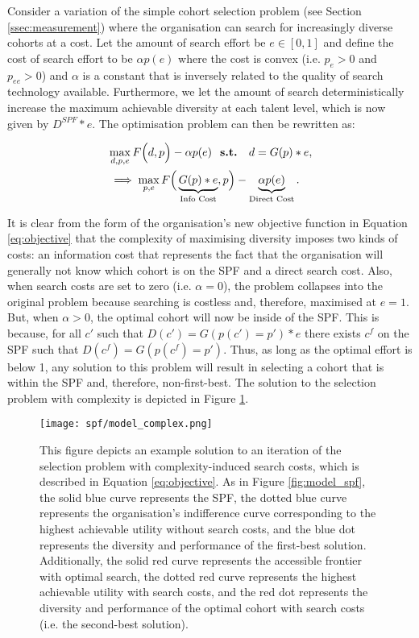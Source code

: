 Consider a variation of the simple cohort selection problem (see Section \ref{ssec:measurement}) where the organisation can search for increasingly diverse cohorts at a cost. Let the amount of search effort be $e\in[0,1]$ and define the cost of search effort to be $\alpha p(e)$ where the cost is convex (i.e. $p_e>0$ and $p_{ee}>0$) and $\alpha$ is a constant that is inversely related to the quality of search technology available. Furthermore, we let the amount of search deterministically increase the maximum achievable diversity at each talent level, which is now given by $D^{SPF}*e$. The optimisation problem can then be rewritten as:

\begin{align}
&\max_{d,p,e} F\Big(d,p\Big) - \alpha p(e) \text{ \bf{ s.t. } } d = G(p)*e, \nonumber \\ 
& \implies \max_{p,e} F\Big(\underbrace{G(p)*e}_{\text{Info Cost}} ,p\Big) - \underbrace{\alpha p(e)}_{\text{Direct Cost}}. \label{eq:objective}
\end{align}

It is clear from the form of the organisation's new objective function in Equation \ref{eq:objective} that the complexity of maximising diversity imposes two kinds of costs: an information cost that represents the fact that the organisation will generally not know which cohort is on the SPF and a direct search cost. Also, when search costs are set to zero (i.e. $\alpha=0$), the problem collapses into the original problem because searching is costless and, therefore, maximised at $e=1$. But, when $\alpha>0$, the optimal cohort will now be inside of the SPF. This is because, for all $c'$ such that  $D(c')=G(p(c')=p')*e$ there exists $c^f$ on the SPF such that $D(c^f)=G(p(c^f)=p')$. Thus, as long as the optimal effort is below 1, any solution to this problem will result in selecting a cohort that is within the SPF and, therefore, non-first-best. The solution to the selection problem with complexity is depicted in Figure \ref{fig:model_complex}.

\begin{figure}[!htb]
    \centering
    \caption{This figure depicts an example solution to an iteration of the selection problem with complexity-induced search costs, which is described in Equation \ref{eq:objective}. As in Figure \ref{fig:model_spf}, the solid blue curve represents the SPF, the dotted blue curve represents the organisation's indifference curve corresponding to the highest achievable utility without search costs, and the blue dot represents the diversity and performance of the first-best solution. Additionally, the solid red curve represents the accessible frontier with optimal search, the dotted red curve represents the highest achievable utility with search costs, and the red dot represents the diversity and performance of the optimal cohort with search costs (i.e. the second-best solution).}
    \label{fig:model_complex}
    \texttt{[image: spf/model\_complex.png]} 
\end{figure}

